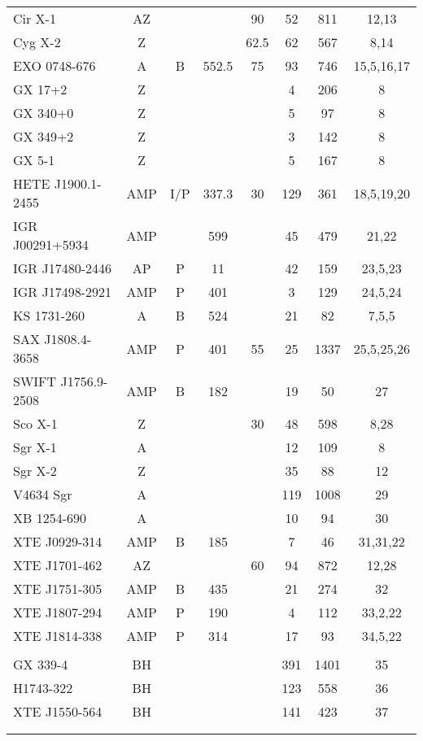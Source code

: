 \begin{landscape}
\begin{longtable}{@{\extracolsep{\fill}}>{\centering\arraybackslash}p{4cm}ccccccc@{}}
Cir X-1&AZ&&&90&52&811&12,13\\
Cyg X-2&Z&&&62.5&62&567&8,14\\
EXO 0748-676&A&B&552.5&75&93&746&15,5,16,17\\
GX 17+2&Z&&&&4&206&8\\
GX 340+0&Z&&&&5&97&8\\
GX 349+2&Z&&&&3&142&8\\
GX 5-1&Z&&&&5&167&8\\
HETE J1900.1-2455&AMP&I/P&337.3&30&129&361&18,5,19,20\\
IGR J00291+5934&AMP&&599&&45&479&21,22\\
IGR J17480-2446&AP&P&11&&42&159&23,5,23\\
IGR J17498-2921&AMP&P&401&&3&129&24,5,24\\
KS 1731-260&A&B&524&&21&82&7,5,5\\
SAX J1808.4-3658&AMP&P&401&55&25&1337&25,5,25,26\\
SWIFT J1756.9-2508&AMP&B&182&&19&50&27\\
Sco X-1&Z&&&30&48&598&8,28\\
Sgr X-1&A&&&&12&109&8\\
Sgr X-2&Z&&&&35&88&12\\
V4634 Sgr&A&&&&119&1008&29\\
XB 1254-690&A&&&&10&94&30\\
XTE J0929-314&AMP&B&185&&7&46&31,31,22\\
XTE J1701-462&AZ&&&60&94&872&12,28\\
XTE J1751-305&AMP&B&435&&21&274&32\\
XTE J1807-294&AMP&P&190&&4&112&33,2,22\\
XTE J1814-338&AMP&P&314&&17&93&34,5,22\\
\midrule
\\[-20pt]
GX 339-4&BH&&&&391&1401&35\\
H1743-322&BH&&&&123&558&36\\
XTE J1550-564&BH&&&&141&423&37\\
\bottomrule
\\[-7pt]
\multicolumn{8}{L{23cm}}{
}
\end{longtable}
\end{landscape}
